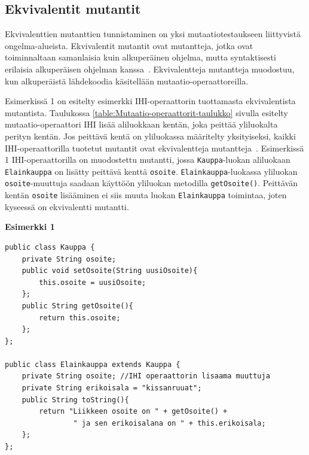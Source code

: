\documentclass[finnish, grading]{tktltiki2}
\theoremstyle{definition}
\theoremstyle{remark}
\begin{document}

\subsection{Ekvivalentit mutantit}

Ekvivalenttien mutanttien tunnistaminen on yksi mutaatiotestaukseen liittyvistä ongelma-alueista. Ekvivalentit mutantit ovat mutantteja, jotka ovat toiminnaltaan samanlaisia kuin alkuperäinen ohjelma, mutta syntaktisesti erilaisia alkuperäisen ohjelman kanssa~\cite[s. 652]{Jia:Harman:2011}. Ekvivalentteja mutantteja muodostuu, kun alkuperäistä lähdekoodia käsitellään mutaatio-operaattoreilla. 

Esimerkissä 1 on esitelty esimerkki IHI-operaattorin tuottamasta ekvivalentista mutantista. Taulukossa \ref{table:Mutaatio-operaattorit-taulukko} sivulla \pageref{table:Mutaatio-operaattorit-taulukko} esitelty mutaatio-operaattori IHI lisää aliluokkaan kentän, joka peittää yliluokalta perityn kentän. Jos peittävä kentä on yliluokassa määritelty yksityiseksi, kaikki IHI-operaattorilla tuotetut mutantit ovat ekvivalentteja mutantteja~\cite[s. 80]{Offutt:Ma:Kwon:2006:MuClassLevel}. Esimerkissä 1 IHI-operaattorilla on muodostettu mutantti, jossa \texttt{Kauppa}-luokan aliluokaan \texttt{Elainkauppa} on lisätty peittävä kenttä \texttt{osoite}. \texttt{Elainkauppa}-luokassa yliluokan \texttt{osoite}-muuttuja saadaan käyttöön yliluokan metodilla \texttt{getOsoite()}. Peittävän kentän \texttt{osoite} lisääminen ei siis muuta luokan \texttt{Elainkauppa} toimintaa, joten kyseessä on ekvivalentti mutantti. 

\vspace{1\baselineskip}\noindent\textbf{Esimerkki 1}
\begin{lstlisting} 
public class Kauppa {
	private String osoite;
	public void setOsoite(String uusiOsoite){
		this.osoite = uusiOsoite;
	};
	public String getOsoite(){
		return this.osoite;
	};
};

public class Elainkauppa extends Kauppa {
	private String osoite; //IHI operaattorin lisaama muuttuja
	private String erikoisala = "kissanruuat";
	public String toString(){
		return "Liikkeen osoite on " + getOsoite() +
		        " ja sen erikoisalana on " + this.erikoisala;
	};
};
\end{lstlisting}
\end{document}
